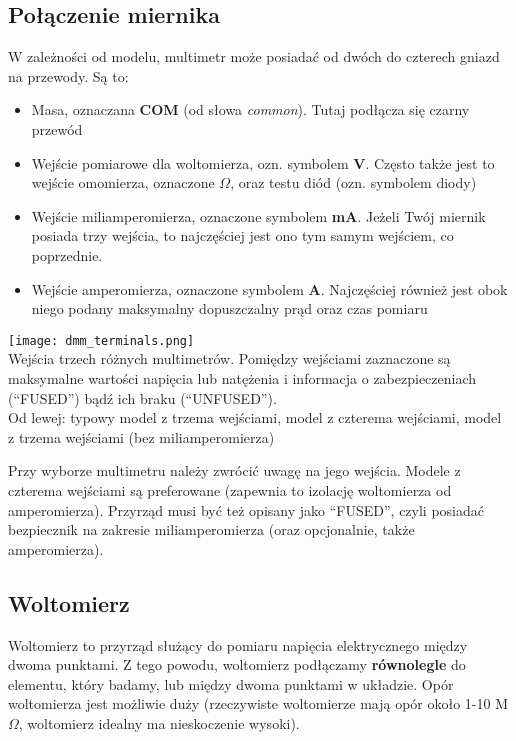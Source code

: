 \documentclass{pdfBooklets}
\begin{document}
\subsection{Połączenie miernika}
W zależności od modelu, multimetr może posiadać od dwóch do czterech gniazd na przewody. Są to:
\begin{itemize}
\item Masa, oznaczana \textbf{COM} (od słowa \textit{common}). Tutaj podłącza się czarny przewód
\item Wejście pomiarowe dla woltomierza, ozn. symbolem \textbf{V}. Często także jest to wejście omomierza, oznaczone \textbf{$\Omega$},
  oraz testu diód (ozn. symbolem diody)
\item Wejście miliamperomierza, oznaczone symbolem \textbf{mA}. Jeżeli Twój miernik posiada trzy wejścia, to najczęściej jest ono
  tym samym wejściem, co poprzednie.
\item Wejście amperomierza, oznaczone symbolem \textbf{A}. Najczęściej również jest obok niego podany maksymalny dopuszczalny prąd
  oraz czas pomiaru
\end{itemize}
\begin{center}
  {\noindent\texttt{[image: dmm\_terminals.png]}}\\
  Wejścia trzech różnych multimetrów. Pomiędzy wejściami zaznaczone są maksymalne wartości napięcia lub natężenia i informacja o zabezpieczeniach
  (``FUSED'') bądź ich braku (``UNFUSED'').\\
  Od lewej: typowy model z trzema wejściami, model z czterema wejściami, model z trzema wejściami (bez miliamperomierza)
\end{center}

Przy wyborze multimetru należy zwrócić uwagę na jego wejścia. Modele z czterema wejściami są preferowane (zapewnia to izolację woltomierza
od amperomierza). Przyrząd musi być też opisany jako ``FUSED'', czyli posiadać bezpiecznik na zakresie miliamperomierza (oraz opcjonalnie,
także amperomierza).
\\

\subsection{Woltomierz}
Woltomierz to przyrząd służący do pomiaru napięcia elektrycznego między dwoma punktami. Z tego powodu, woltomierz podłączamy
\textbf{równolegle} do elementu, który badamy, lub między dwoma punktami w układzie. Opór woltomierza jest możliwie duży (rzeczywiste
woltomierze mają opór około 1-10 M$\Omega$, woltomierz idealny ma nieskoczenie wysoki).
\end{document}
